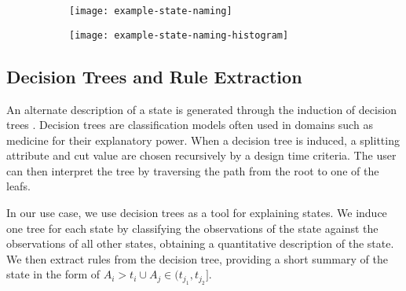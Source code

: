 \begin{figure}[h!]
	\centering
	\begin{subfigure}{.48\columnwidth}
	  	\centering
	  	\texttt{[image: example-state-naming]}
  		\caption{}
  		\label{fig:example-naming-label}
	\end{subfigure}
	\begin{subfigure}{.48\columnwidth}
	  	\centering
	  	\texttt{[image: example-state-naming-histogram]}
	  	\caption{}
	  	\label{fig:example-naming-histogram}
	\end{subfigure}
	\label{fig:example-naming}
\end{figure}

\iffalse
In order to assist the user in identifying the meaning of states, the system provides automatic default
state names, based on the distribution of attributes in the state. Each state is given a default name
by combining its most outstanding attribute with a discrete level: LOWEST, LOW, HIGH or
HIGHEST.

The attribute and the level are chosen by comparing its distribution inside the state to the global
distribution in all the states through histograms. This is achieved by first computing the percentiles
of the global distribution. The $40^{th}$ percentile is then computed for the state distribution and
compared against the global distribution. If this percentile lies below the $25^{th}$ or $12^{th}$
percentile, the state is marked with LOW or LOWEST respectively. The final name is chosen according
to the attribute which lies in the lowest percentile.
\fi

\subsection{Decision Trees and Rule Extraction}

An alternate description of a state is generated through the induction of decision trees \cite{Witten:2005:DMP:1205860}. Decision
trees are classification models often used in domains such as medicine for their explanatory power.
When a decision tree is induced, a splitting attribute and cut value are chosen recursively by a
design time criteria. The user can then interpret the tree by traversing the path from the root 
to one of the leafs.

In our use case, we use decision trees as a tool for explaining states. We induce one tree for each
state by classifying the observations of the state against the observations of all other states,
obtaining a quantitative description of the state. We then extract rules from the decision tree,
providing a short summary of the state in the form of $A_i > t_i \cup A_j \in (t_{j_1}, t_{j_2}]$.

